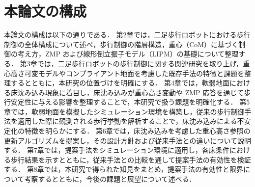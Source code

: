
\section{本論文の構成}

本論文の構成は以下の通りである．
第2章では，二足歩行ロボットにおける歩行制御の全体構成について述べ，歩行制御の階層構造，重心（CoM）に基づく制御の考え方，ZMP および線形倒立振子モデル（LIPM）の基礎について整理する．
第3章では，二足歩行ロボットの歩行制御に関する関連研究を取り上げ，重心高さ可変モデルやコンプライアント地面を考慮した既存手法の特徴と課題を整理するとともに，本研究の位置づけを明確にする．
第4章では，軟弱地面における床沈み込み現象に着目し，床沈み込みが重心高さ変動や ZMP 応答を通じて歩行安定性に与える影響を整理することで，本研究で扱う課題を明確化する．
第5章では，軟弱地面を模擬したシミュレーション環境を構築し，従来の歩行制御手法を適用した際に観測される歩行挙動を解析することで，床沈み込みによる不安定化の特徴を明らかにする．
第6章では，床沈み込みを考慮した重心高さ参照の更新アルゴリズムを提案し，その設計方針および従来手法との違いについて説明する．
第7章では，提案手法をシミュレーション環境に適用し，各床条件における歩行結果を示すとともに，従来手法との比較を通して提案手法の有効性を検証する．
第8章では，本研究で得られた知見をまとめ，提案手法の有効性と限界について考察するとともに，今後の課題と展望について述べる．
